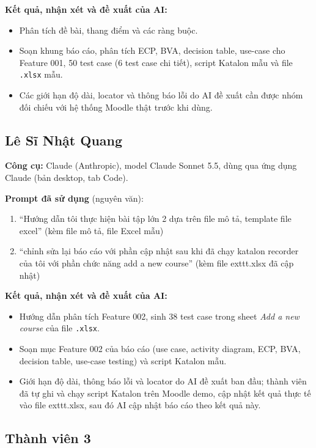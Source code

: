 \documentclass[12pt,a4paper]{article}
\newcommand{\todo}[1]{\textcolor{red}{\textbf{[#1]}}}
\begin{document}
\noindent\textbf{Kết quả, nhận xét và đề xuất của AI:}
\begin{itemize}[noitemsep]
  \item Phân tích đề bài, thang điểm và các ràng buộc.
  \item Soạn khung báo cáo, phân tích ECP, BVA, decision table, use-case cho Feature 001, 50 test case (6 test case chi tiết),
        script Katalon mẫu và file \texttt{.xlsx} mẫu.
  \item Các giới hạn độ dài, locator và thông báo lỗi do AI đề xuất cần được nhóm đối chiếu với hệ thống Moodle thật trước khi dùng.
\end{itemize}

\subsection{Lê Sĩ Nhật Quang}
\textbf{Công cụ:} Claude (Anthropic), model Claude Sonnet 5.5, dùng qua ứng dụng Claude (bản desktop, tab Code).

\noindent\textbf{Prompt đã sử dụng} (nguyên văn):
\begin{enumerate}[noitemsep]
  \item ``Hướng dẫn tôi thực hiện bài tập lớn 2 dựa trên file mô tả, template file excel'' (kèm file mô tả, file Excel mẫu)
  \item ``chỉnh sửa lại báo cáo với phần cập nhật sau khi đã chạy katalon recorder của tôi với phần chức năng add a new course'' (kèm file 	exttt{.xlsx} đã cập nhật)
\end{enumerate}

\noindent\textbf{Kết quả, nhận xét và đề xuất của AI:}
\begin{itemize}[noitemsep]
  \item Hướng dẫn phân tích Feature 002, sinh 38 test case trong sheet \textit{Add a new course} của file \texttt{.xlsx}.
  \item Soạn mục Feature 002 của báo cáo (use case, activity diagram, ECP, BVA, decision table, use-case testing) và script Katalon mẫu.
  \item Giới hạn độ dài, thông báo lỗi và locator do AI đề xuất ban đầu; thành viên đã tự ghi và chạy script Katalon trên Moodle demo, cập nhật kết quả thực tế vào file 	exttt{.xlsx}, sau đó AI cập nhật báo cáo theo kết quả này.
\end{itemize}
\subsection{Thành viên 3}
\end{document}
